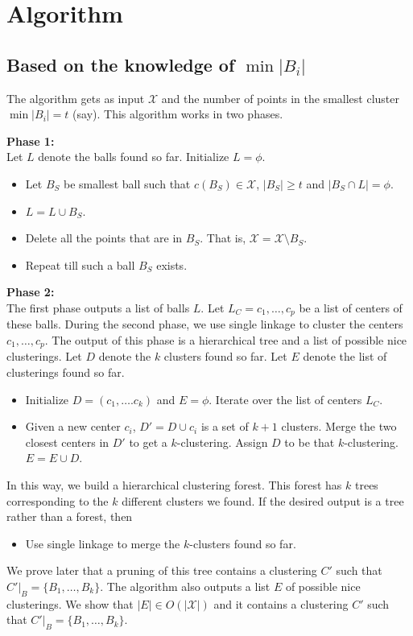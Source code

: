 \documentclass[11pt]{article}
\begin{document}
\section{Algorithm}

\subsection{Based on the knowledge of $\min |B_i|$}
The algorithm gets as input $\mathcal{X}$ and the number of points in the smallest cluster $\min |B_i| = t$ (say). This algorithm works in two phases.

\noindent \textbf{Phase 1:}\\ Let $L$ denote the balls found so far. Initialize $L = \phi$.
\begin{itemize}
\item Let $B_S$ be smallest ball such that $c(B_S) \in \mathcal{X}$, $|B_S| \ge t$  and $|B_S \cap L | = \phi$.
\item $L = L \cup B_S$.
\item Delete all the points that are in $B_S$. That is, $\mathcal{X} = \mathcal{X}\setminus B_S$.
\item Repeat till such a ball $B_S$ exists.
\end{itemize}

\noindent \textbf{Phase 2:}\\ The first phase outputs a list of balls $L$. Let $L_C = c_1,\ldots,c_p$ be a list of centers of these balls. During the second phase, we use single linkage to cluster the centers $c_1,\ldots,c_p$. The output of this phase is a hierarchical tree and a list of possible nice clusterings. Let $D$ denote the $k$ clusters found so far. Let $E$ denote the list of clusterings found so far.
\begin{itemize}
\item Initialize $D = (c_1,\ldots.c_k)$ and $E = \phi$. Iterate over the list of centers $L_C$.
\item Given a new center $c_i$, $D' = D \cup c_i$ is a set of $k+1$ clusters. Merge the two closest centers in $D'$ to get a $k$-clustering. Assign $D$ to be that $k$-clustering. $E = E \cup D$.
\end{itemize}

\noindent In this way, we build a hierarchical clustering forest. This forest has $k$ trees corresponding to the $k$ different clusters we found. If the desired output is a tree rather than a forest, then 
\begin{itemize}
\item Use single linkage to merge the $k$-clusters found so far. 
\end{itemize}
We prove later that a pruning of this tree contains a clustering $C'$ such that $C'|_B = \{B_1,\ldots,B_k\}$. The algorithm also outputs a list $E$ of possible nice clusterings. We show that $|E| \in O(|\mathcal{X}|)$ and it contains a clustering $C'$ such that $C'|_B = \{B_1,\ldots,B_k\}$.
\end{document}
